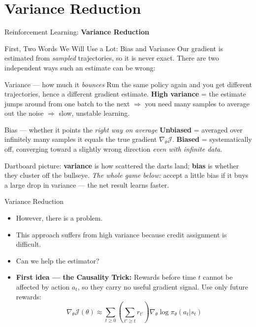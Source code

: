 \section{Variance Reduction}
\begin{frame}{}
    \LARGE Reinforcement Learning: \textbf{Variance Reduction}
\end{frame}

\begin{frame}{First, Two Words We Will Use a Lot: Bias and Variance}
Our gradient is estimated from \emph{sampled} trajectories, so it is never exact. There are two independent ways such an estimate can be wrong:
\vspace{0.3em}
\begin{block}{Variance --- how much it \emph{bounces}}
Run the same policy again and you get different trajectories, hence a different gradient estimate. \textbf{High variance} = the estimate jumps around from one batch to the next $\Rightarrow$ you need many samples to average out the noise $\Rightarrow$ slow, unstable learning.
\end{block}
\begin{block}{Bias --- whether it points the \emph{right way on average}}
\textbf{Unbiased} = averaged over infinitely many samples it equals the true gradient $\nabla_\theta \mathcal{J}$. \textbf{Biased} = systematically off, converging toward a slightly wrong direction \emph{even with infinite data}.
\end{block}
\vspace{0.2em}
Dartboard picture: \textbf{variance} is how scattered the darts land; \textbf{bias} is whether they cluster off the bullseye. \emph{The whole game below:} accept a little bias if it buys a large drop in variance --- the net result learns faster.
\end{frame}

\begin{frame}{Variance Reduction}
\begin{itemize}
    \item However, there is a problem.
    \item This approach suffers from high variance because credit assignment is difficult.
    \item Can we help the estimator?
    \pause
    \item \textbf{First idea --- the Causality Trick:} Rewards before time $t$ cannot be affected by action $a_t$, so they carry no useful gradient signal. Use only future rewards:
    $$\nabla_\theta \mathcal{J}(\theta) \approx \sum_{t \geq 0} \left( \sum_{t' \geq t} r_{t'} \right ) \nabla_\theta \log \pi_\theta (a_t|s_t) $$
\end{itemize}
\end{frame}

